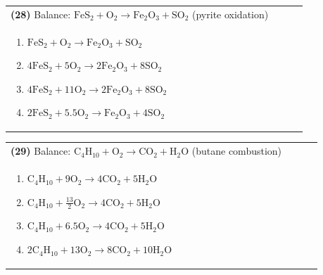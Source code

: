 \documentclass{article}
\begin{document}
\vspace{0.2cm}
\noindent \begin{tabular}{|p{0.9\linewidth}|}
\hline
\vspace{0.2cm}
\textbf{(28)} Balance: \(\mathrm{FeS_2 + O_2 \rightarrow Fe_2O_3 + SO_2}\) (pyrite oxidation)\\
\begin{minipage}[t]{0.85\linewidth}
\begin{enumerate}[label=\alph*.]
   \item \(\mathrm{FeS_2 + O_2 \rightarrow Fe_2O_3 + SO_2}\)
   \item \(\mathrm{4FeS_2 + 5O_2 \rightarrow 2Fe_2O_3 + 8SO_2}\)
   \item \(\mathrm{4FeS_2 + 11O_2 \rightarrow 2Fe_2O_3 + 8SO_2}\)
   \item \(\mathrm{2FeS_2 + 5.5O_2 \rightarrow Fe_2O_3 + 4SO_2}\)
\end{enumerate}
\end{minipage}\\
\hline
\end{tabular}
\newpage

\vspace{0.2cm}
\noindent \begin{tabular}{|p{0.9\linewidth}|}
\hline
\vspace{0.2cm}
\textbf{(29)} Balance: \(\mathrm{C_4H_{10} + O_2 \rightarrow CO_2 + H_2O}\) (butane combustion)\\
\begin{minipage}[t]{0.85\linewidth}
\begin{enumerate}[label=\alph*.]
   \item \(\mathrm{C_4H_{10} + 9O_2 \rightarrow 4CO_2 + 5H_2O}\)
   \item \(\mathrm{C_4H_{10} + \tfrac{13}{2}O_2 \rightarrow 4CO_2 + 5H_2O}\)
   \item \(\mathrm{C_4H_{10} + 6.5O_2 \rightarrow 4CO_2 + 5H_2O}\)
   \item \(\mathrm{2C_4H_{10} + 13O_2 \rightarrow 8CO_2 + 10H_2O}\)
\end{enumerate}
\end{minipage}\\
\hline
\end{tabular}
\end{document}
